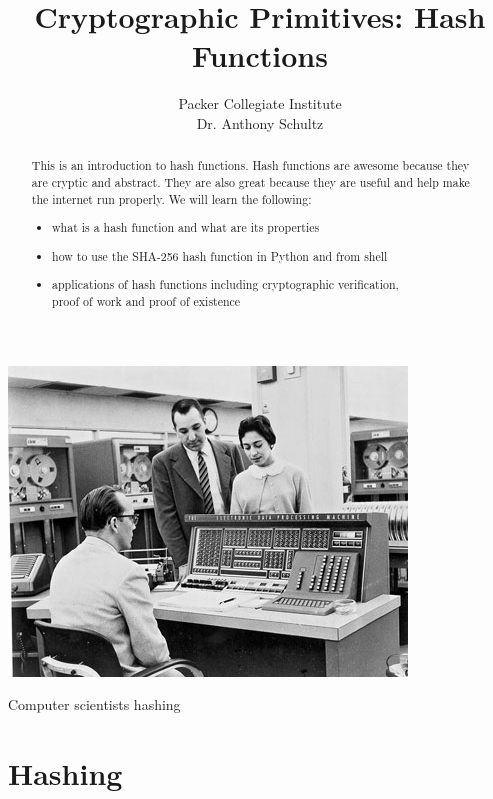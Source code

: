 \documentclass{tufte-handout}
\title{Cryptographic Primitives: Hash Functions}
\author[Packer]{Packer Collegiate Institute\\Dr. Anthony Schultz}
\begin{document}
\maketitle%
\begin{marginfigure}%
  \includegraphics[width=\linewidth]{IBM.jpg}
  \caption{Computer scientists hashing }
  \label{fig:marginfig}
\end{marginfigure}
\begin{abstract}
\noindent
This is an introduction to hash functions.  Hash functions are awesome because they are cryptic and abstract.  They are also great because they are useful and help make the internet run properly.   We will learn the following: 
\begin{itemize}
\item what is a hash function and what are its properties
\item how to use the SHA-256 hash function in Python and from shell
 \item applications of hash functions including cryptographic verification, \\proof of work and proof of existence
 \end{itemize} \end{abstract}

\normalsize


\section{Hashing}
\end{document}
